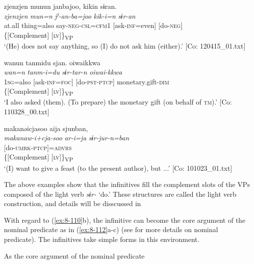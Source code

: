\ea
{\TM}
\gllll  zjenzjen  munun  janbajoo,  kikin  sɨran.\\
\textit{zjenzjen}  \textit{mun=n}  \textit{jˀ-an-ba=joo}  \textit{kik-i=n}  \textit{sɨr-an}\\
at.all  thing=also  say-\textsc{neg}-\textsc{csl}=\textsc{cfm1}  [ask-\textsc{inf}=even]  [do-\textsc{neg}]\\
            \{[Complement]  [\textsc{lv}]\}\textsubscript{VP}\\
\glt ‘(He) does not say anything, so (I) do not ask him (either).’ [Co: 120415\_01.txt]

\ex {\TM}
\gllll  wanun  tanmidu  sjan.  {\textbar}oiwai{\textbar}kkwa\\
\textit{wan=n}  \textit{tanm-i=du}  \textit{sɨr-tar-n  oiwai-kkwa}\\
1\textsc{sg}=also  [ask-\textsc{inf}=\textsc{foc}]  [do-\textsc{pst}-\textsc{ptcp}]  monetary.gift-\textsc{dim}\\
        \{[Complement]  [\textsc{lv}]\}\textsubscript{VP}\\
\glt ‘I also asked (them). (To prepare) the monetary gift (on behalf of \textsc{tm}).’ [Co: 110328\_00.txt]

\ex {\TM}
\glll  makanəicjasoo  aija  sjunban,\\
\textit{makanaw-i+cja-soo}  \textit{ar-i=ja}  \textit{sɨr-jur-n=ban}\\
[give.a.feast-\textsc{ing}+want-\textsc{adj}  \textsc{stv}-\textsc{inf}=\textsc{top}]  [do-\textsc{umrk}-\textsc{ptcp}]=\textsc{advrs}\\
      \{[Complement]    [\textsc{lv}]\}\textsubscript{VP}\\
\glt ‘(I) want to give a feast (to the present author), but ...’ [Co: 101023\_01.txt]
\z
\z

The above examples show that the infinitives fill the complement slots of the VPs composed of the light verb \textit{sɨr-} ‘do.’ These structures are called the light verb construction, and details will be disscussed in 

  With regard to (\ref{ex:8-110}b), the infinitive can become the core argument of the nominal predicate as in (\ref{ex:8-112}a-c) (see  for more details on nominal predicate). The infinitives take simple forms in this environment.

\ea\label{ex:8-112}
  As the core argument of the nominal predicate

